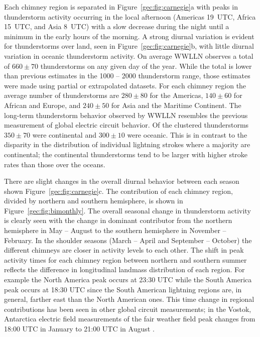 Each chimney region is separated in Figure~\ref{gec:fig:carnegie}a with peaks in thunderstorm activity occurring in the local afternoon (Americas 19~UTC, Africa 15~UTC, and Asia 8~UTC) with a slow decrease during the night until a minimum in the early hours of the morning.
A strong diurnal variation is evident for thunderstorms over land, seen in Figure~\ref{gec:fig:carnegie}b, with  little diurnal variation in oceanic thunderstorm activity.
On average WWLLN observes a total of $660 \pm 70$ thunderstorms on any given day of the year.
While the total is lower than previous estimates in the 1000 -- 2000 thunderstorm range, those estimates were made using partial or extrapolated datasets.
For each chimney region the average number of thunderstorms are $280 \pm 80$ for the Americas, $140 \pm 60$ for African and Europe, and $240 \pm 50$ for Asia and the Maritime Continent.
The long-term thunderstorm behavior observed by WWLLN resembles the previous measurement of global electric circuit behavior.
Of the clustered thunderstorms $350 \pm 70$ were continental and $300 \pm 10$ were oceanic.
This is in contrast to the disparity in the distribution of individual lightning strokes where a majority are continental; the continental thunderstorms tend to be larger with higher stroke rates than those over the oceans.

There are slight changes in the overall diurnal behavior between each season shown Figure~\ref{gec:fig:carnegie}c.
The contribution of each chimney region, divided by northern and southern hemisphere, is shown in Figure~\ref{gec:fig:bimonthly}.
The overall seasonal change in thunderstorm activity is clearly seen with the change in dominant contributor from the northern hemisphere in May -- August to the southern hemisphere in November -- February.
In the shoulder seasons (March -- April and September -- October) the different chimneys are closer in activity levels to each other.
The shift in peak activity times for each chimney region between northern and southern summer reflects the difference in longitudinal landmass distribution of each region.
For example the North America peak occurs at 23:30 UTC while the South America peak occurs at 18:30 UTC since the South American lightning regions are, in general, farther east than the North American ones.
This time change in regional contributions has been seen in other global circuit measurements; in the Vostok, Antarctica electric field measurements of the fair weather field peak changes from 18:00 UTC in January to 21:00 UTC in August \citep{Burns2005, Burns2012}.

